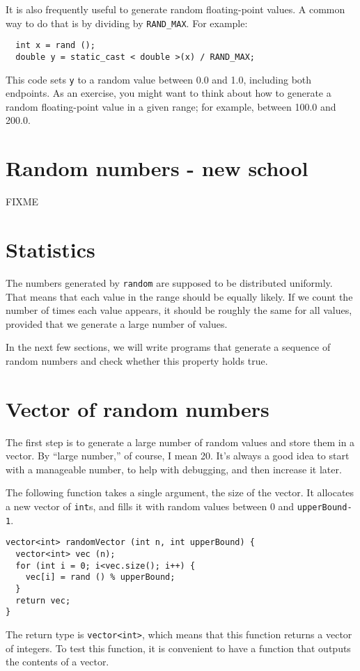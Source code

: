 It is also frequently useful to generate random floating-point values.
A common way to do that is by dividing by {\tt RAND\_MAX}.  For
example:

\begin{verbatim}
  int x = rand ();
  double y = static_cast < double >(x) / RAND_MAX;
\end{verbatim}
%
This code sets {\tt y} to a random value between 0.0 and 1.0,
including both endpoints.  As an exercise, you might want to
think about how to generate a random floating-point value in
a given range; for example, between 100.0 and 200.0.
\section{Random numbers - new school}
FIXME

\section{Statistics}

The numbers generated by {\tt random} are supposed to be distributed
uniformly.  That means that each value in the range should be
equally likely.  If we count the number of times each value appears,
it should be roughly the same for all values, provided that we
generate a large number of values.

In the next few sections, we will write programs that generate
a sequence of random numbers and check whether this property
holds true.

\section{Vector of random numbers}

The first step is to generate a large number of random values
and store them in a vector.  By ``large number,'' of course,
I mean 20.  It's always a good idea to start with a manageable
number, to help with debugging, and then increase it later.

The following function takes a single argument, the size of
the vector.  It allocates a new vector of {\tt int}s, 
and fills it with random values between 0 and {\tt upperBound-1}.

\begin{verbatim}
vector<int> randomVector (int n, int upperBound) {
  vector<int> vec (n);
  for (int i = 0; i<vec.size(); i++) {
    vec[i] = rand () % upperBound;
  }
  return vec;
}
\end{verbatim}
%
The return type is {\tt vector<int>}, which means that
this function returns a vector of integers.
To test this function, it is convenient to have a function that
outputs the contents of a vector.

